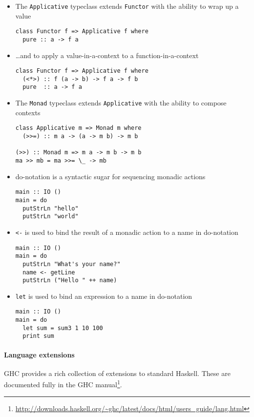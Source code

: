 \begin{itemize}
\item The \verb|Applicative| typeclass extends \verb|Functor| with the
  ability to wrap up a value
\begin{verbatim}
class Functor f => Applicative f where
  pure :: a -> f a
\end{verbatim}

\pagebreak
\item \ldots{}and to apply a value-in-a-context to a
  function-in-a-context
\begin{verbatim}
class Functor f => Applicative f where
  (<*>) :: f (a -> b) -> f a -> f b
  pure  :: a -> f a
\end{verbatim}

\item The \verb|Monad| typeclass extends \verb|Applicative| with the
  ability to compose contexts
\begin{verbatim}
class Applicative m => Monad m where
  (>>=) :: m a -> (a -> m b) -> m b

(>>) :: Monad m => m a -> m b -> m b
ma >> mb = ma >>= \_ -> mb
\end{verbatim}

\item do-notation is a syntactic sugar for sequencing monadic actions
\begin{verbatim}
main :: IO ()
main = do
  putStrLn "hello"
  putStrLn "world"
\end{verbatim}

\item \verb|<-| is used to bind the result of a monadic action to a
  name in do-notation
\begin{verbatim}
main :: IO ()
main = do
  putStrLn "What's your name?"
  name <- getLine
  putStrLn ("Hello " ++ name)
\end{verbatim}

\item \verb|let| is used to bind an expression to a name in
  do-notation
\begin{verbatim}
main :: IO ()
main = do
  let sum = sum3 1 10 100
  print sum
\end{verbatim}
\end{itemize}

\paragraph{Language extensions}
GHC provides a rich collection of extensions to standard Haskell.
These are documented fully in the GHC
manual\footnote{\url{http://downloads.haskell.org/~ghc/latest/docs/html/users_guide/lang.html}}.

